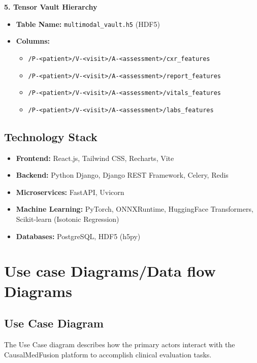 \documentclass{fisatprojectfinal}
\begin{document}
\textbf{5. Tensor Vault Hierarchy}
\begin{itemize}
    \item \textbf{Table Name:} \texttt{multimodal\_vault.h5} (HDF5)
    \item \textbf{Columns:}
    \begin{itemize}
        \item \texttt{/P-<patient>/V-<visit>/A-<assessment>/cxr\_features} 
        \item \texttt{/P-<patient>/V-<visit>/A-<assessment>/report\_features} 
        \item \texttt{/P-<patient>/V-<visit>/A-<assessment>/vitals\_features} 
        \item \texttt{/P-<patient>/V-<visit>/A-<assessment>/labs\_features} 
    \end{itemize}
\end{itemize}

\subsection{Technology Stack}
\begin{itemize}
    \item \textbf{Frontend:} React.js, Tailwind CSS, Recharts, Vite
    \item \textbf{Backend:} Python Django, Django REST Framework, Celery, Redis
    \item \textbf{Microservices:} FastAPI, Uvicorn 
    \item \textbf{Machine Learning:} PyTorch, ONNXRuntime, HuggingFace Transformers, Scikit-learn (Isotonic Regression)
    \item \textbf{Databases:} PostgreSQL, HDF5 (h5py)
\end{itemize}

\section{Use case Diagrams/Data flow Diagrams}

\subsection{Use Case Diagram}
The Use Case diagram describes how the primary actors interact with the CausalMedFusion platform to accomplish clinical evaluation tasks.
\end{document}
